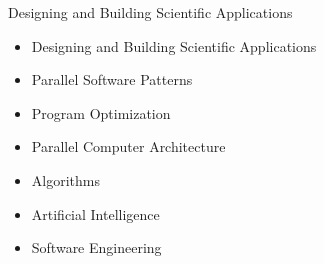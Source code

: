 
Designing and Building Scientific Applications
\renewcommand*{\do}[1]{,#1}\forcsvlist{1}{\}{}


}

\begin{itemize}
\item Designing and Building Scientific Applications
\item Parallel Software Patterns
\item Program Optimization
\item Parallel Computer Architecture 
\item Algorithms 
\item Artificial Intelligence
\item Software Engineering
\end{itemize} 
